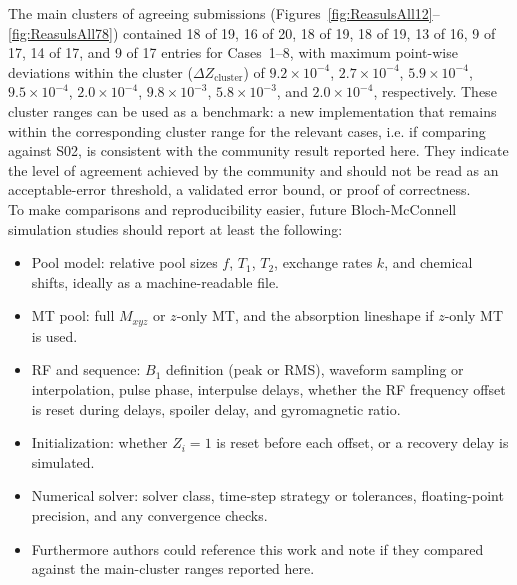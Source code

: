 \documentclass[11pt,a4paper]{article}
\begin{document}
The main clusters of agreeing submissions (Figures~\ref{fig:ReasulsAll12}--\ref{fig:ReasulsAll78}) contained 18 of 19, 16 of 20, 18 of 19, 18 of 19, 13 of 16, 9 of 17, 14 of 17, and 9 of 17 entries for Cases~1--8, with maximum point-wise deviations within the cluster ($\Delta Z_{\mathrm{cluster}}$) of $9.2\times10^{-4}$, $2.7\times10^{-4}$, $5.9\times10^{-4}$, $9.5\times10^{-4}$, $2.0\times10^{-4}$, $9.8\times10^{-3}$, $5.8\times10^{-3}$, and $2.0\times10^{-4}$, respectively.
These cluster ranges can be used as a benchmark: a new implementation that remains within the corresponding cluster range for the relevant cases, i.e. if comparing against S02, is consistent with the community result reported here.
They indicate the level of agreement achieved by the community and should not be read as an acceptable-error threshold, a validated error bound, or proof of correctness.\\

To make comparisons and reproducibility easier, future Bloch-McConnell simulation studies should report at least the following:
\begin{itemize}
\item Pool model: relative pool sizes $f$, $T_1$, $T_2$, exchange rates $k$, and chemical shifts, ideally as a machine-readable file.
\item MT pool: full $M_{xyz}$ or $z$-only MT, and the absorption lineshape if $z$-only MT is used.
\item RF and sequence: $B_1$ definition (peak or RMS), waveform sampling or interpolation, pulse phase, interpulse delays, whether the RF frequency offset is reset during delays, spoiler delay, and gyromagnetic ratio.
\item Initialization: whether $Z_i=1$ is reset before each offset, or a recovery delay is simulated.
\item Numerical solver: solver class, time-step strategy or tolerances, floating-point precision, and any convergence checks.
\item Furthermore authors could reference this work and note if they compared against the main-cluster ranges reported here.
\end{itemize}
\end{document}
